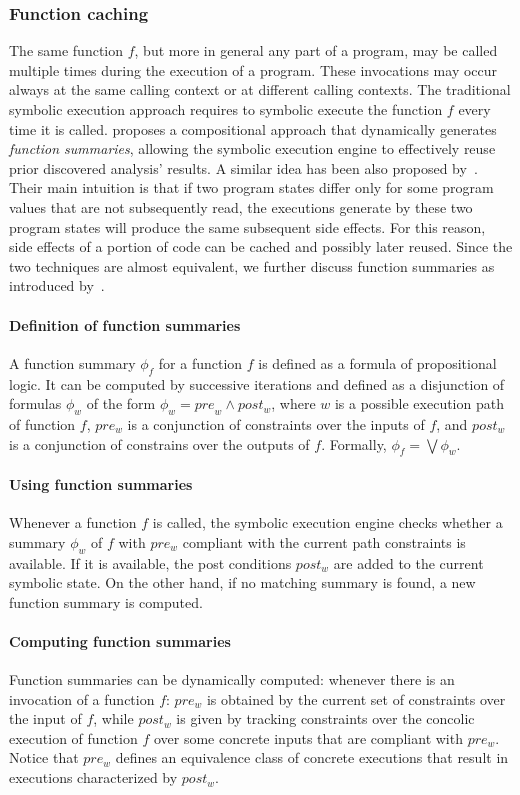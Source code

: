 \subsubsection{Function caching} The same function $f$, but more in general any part of a program, may be called multiple times during the execution of a program. These invocations may occur always at the same calling context or at different calling contexts. The traditional symbolic execution approach requires to symbolic execute the function $f$ every time it is called. \cite{G-POPL07} proposes a compositional approach that dynamically generates {\em function summaries}, allowing the symbolic execution engine to effectively reuse prior discovered analysis' results. A similar idea has been also proposed by~\cite{BCE-TACAS08}. Their main intuition is that if two program states differ only for some program values that are not subsequently read, the executions generate by these two program states will produce the same subsequent side effects. For this reason, side effects of a portion of code can be cached and possibly later reused. Since the two techniques are almost equivalent, we further discuss function summaries as introduced by~\cite{G-POPL07}.

\paragraph{Definition of function summaries} A function summary $\phi_f$ for a function $f$ is defined as a formula of propositional logic. It can be computed by successive iterations and defined as a disjunction of formulas $\phi_w$ of the form $\phi_w = {pre}_w \wedge post_w$, where $w$ is a possible execution path of function $f$, $pre_w$ is a conjunction of constraints over the inputs of $f$, and $post_w$ is a conjunction of constrains over the outputs of $f$. Formally, $\phi_f = \bigvee \phi_w$.  

\paragraph{Using function summaries} Whenever a function $f$ is called, the symbolic execution engine checks whether a summary $\phi_w$ of $f$ with $pre_w$ compliant with the current path constraints is available. If it is available, the post conditions $post_w$ are added to the current symbolic state. On the other hand, if no matching summary is found, a new function summary is computed.

\paragraph{Computing function summaries} Function summaries can be dynamically computed: whenever there is an invocation of a function $f$: $pre_w$ is obtained by the current set of constraints over the input of $f$, while $post_w$ is given by tracking constraints over the concolic execution of function $f$ over some concrete inputs that are compliant with $pre_w$. Notice that $pre_w$ defines an equivalence class of concrete executions that result in executions characterized by $post_w$. 

